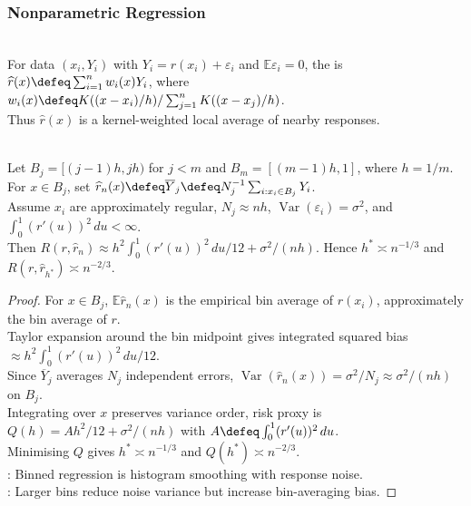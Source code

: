 \subsubsection{Nonparametric Regression}

\begin{definition} \label{def:nadaraya-watson-kernel-regression} \\
For data $(x_i,Y_i)$ with $Y_i=r(x_i)+\varepsilon_i$ and $\mathbb{E}\varepsilon_i=0$, the  is $\widehat r(x)\defeq\sum_{i=1}^{n}w_i(x)Y_i$, where $w_i(x)\defeq K((x-x_i)/h)/\sum_{j=1}^{n}K((x-x_j)/h)$.\\
Thus $\widehat r(x)$ is a kernel-weighted local average of nearby responses.
\end{definition}

\begin{proposition} \label{prop:binned-nonparametric-regression-risk} \\
Let $B_j=[(j-1)h,jh)$ for $j<m$ and $B_m=[(m-1)h,1]$, where $h=1/m$.\\
For $x\in B_j$, set $\widehat r_n(x)\defeq\overline Y_j\defeq N_j^{-1}\sum_{i:x_i\in B_j}Y_i$.\\
Assume $x_i$ are approximately regular, $N_j\approx nh$, $\operatorname{Var}(\varepsilon_i)=\sigma^2$, and $\int_0^1(r'(u))^2\,du<\infty$.\\
Then $R(r,\widehat r_n)\approx h^2\int_0^1(r'(u))^2\,du/12+\sigma^2/(nh)$. Hence $h^*\asymp n^{-1/3}$ and $R(r,\widehat r_{h^*})\asymp n^{-2/3}$.
\begin{proof} For $x\in B_j$, $\mathbb{E}\widehat r_n(x)$ is the empirical bin average of $r(x_i)$, approximately the bin average of $r$.\\
Taylor expansion around the bin midpoint gives integrated squared bias $\approx h^2\int_0^1(r'(u))^2\,du/12$.\\
Since $\overline Y_j$ averages $N_j$ independent errors, $\operatorname{Var}(\widehat r_n(x))=\sigma^2/N_j\approx\sigma^2/(nh)$ on $B_j$.\\
Integrating over $x$ preserves variance order, risk proxy is $Q(h)=Ah^2/12+\sigma^2/(nh)$ with $A\defeq\int_0^1(r'(u))^2\,du$.\\
Minimising $Q$ gives $h^*\asymp n^{-1/3}$ and $Q(h^*)\asymp n^{-2/3}$.\\
: Binned regression is histogram smoothing with response noise.\\
: Larger bins reduce noise variance but increase bin-averaging bias.
\end{proof}
\end{proposition}

